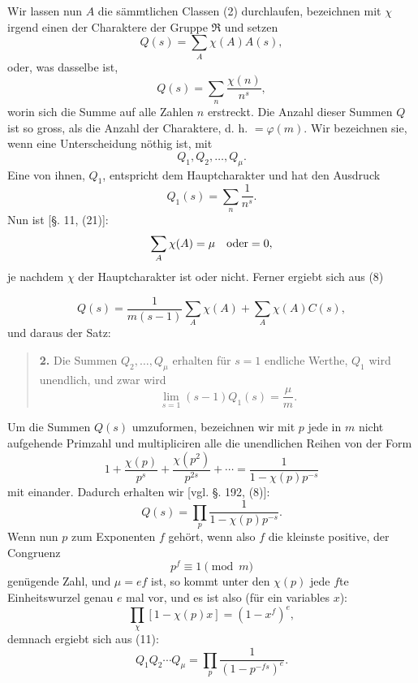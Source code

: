 \documentclass[11pt]{article}
\begin{document}
Wir lassen nun $A$ die sämmtlichen Classen (2) durchlaufen, bezeichnen mit $\chi$ irgend einen der Charaktere der Gruppe $\mathfrak R$ und setzen
\begin{equation}\tag{9}
Q(s)=\sum_A \chi(A)A(s),
\end{equation}
oder, was dasselbe ist,
\begin{equation}\tag{10}
Q(s)=\sum_n \frac{\chi(n)}{n^s},
\end{equation}
worin sich die Summe auf alle Zahlen $n$ erstreckt. Die Anzahl dieser Summen $Q$ ist so gross, als die Anzahl der Charaktere, d. h. $=\varphi(m)$. Wir bezeichnen sie, wenn eine Unterscheidung nöthig ist, mit
\[
Q_1,Q_2,\ldots,Q_\mu.
\]
Eine von ihnen, $Q_1$, entspricht dem Hauptcharakter und hat den Ausdruck
\[
Q_1(s)=\sum_n\frac1{n^s}.
\]
Nun ist [§. 11, (21)]:
\[
\sum_A \chi(A)=\mu\quad \hbox{oder}=0,
\]
je nachdem $\chi$ der Hauptcharakter ist oder nicht. Ferner ergiebt sich aus (8)

\[
Q(s)=\frac{1}{m(s-1)}\sum_A \chi(A)+\sum_A\chi(A)C(s),
\]
und daraus der Satz:

\begin{quote}
\textbf{2.} Die Summen $Q_2,\ldots,Q_\mu$ erhalten für $s=1$ endliche Werthe, $Q_1$ wird unendlich, und zwar wird
\[
\lim_{s=1}(s-1)Q_1(s)=\frac{\mu}{m}.
\]
\end{quote}

Um die Summen $Q(s)$ umzuformen, bezeichnen wir mit $p$ jede in $m$ nicht aufgehende Primzahl und multipliciren alle die unendlichen Reihen von der Form
\[
1+\frac{\chi(p)}{p^s}+\frac{\chi(p^2)}{p^{2s}}+\cdots
=\frac{1}{1-\chi(p)p^{-s}}
\]
mit einander. Dadurch erhalten wir [vgl. §. 192, (8)]:
\begin{equation}\tag{11}
Q(s)=\prod_p \frac{1}{1-\chi(p)p^{-s}}.
\end{equation}
Wenn nun $p$ zum Exponenten $f$ gehört, wenn also $f$ die kleinste positive, der Congruenz
\begin{equation}\tag{12}
p^f\equiv1 \pmod m
\end{equation}
genügende Zahl, und $\mu=ef$ ist, so kommt unter den $\chi(p)$ jede $f$te Einheitswurzel genau $e$ mal vor, und es ist also (für ein variables $x$):
\[
\prod_{\chi}[1-\chi(p)x]=(1-x^f)^e,
\]
demnach ergiebt sich aus (11):
\begin{equation}\tag{13}
Q_1Q_2\cdots Q_\mu=\prod_p \frac{1}{(1-p^{-fs})^e}.
\end{equation}
\end{document}

